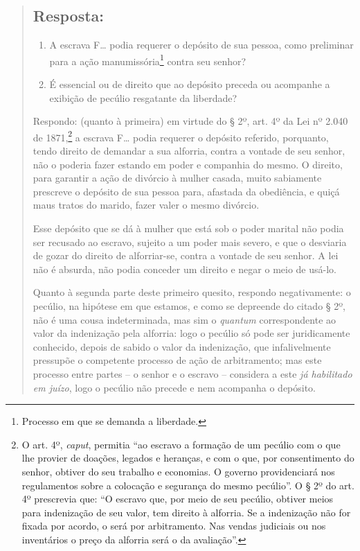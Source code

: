 \begin{quote}
\subsection{Resposta:}

\begin{enumerate}[label=\arabic*º]
O primeiro quesito tem duas partes:

\item A escrava F\ldots{} podia requerer o depósito de sua pessoa, como
preliminar para a ação manumissória\footnote{ Processo em que se
  demanda a liberdade.} contra seu senhor?

\item É essencial ou de direito que ao depósito preceda ou acompanhe a
exibição de pecúlio resgatante da liberdade?
\end{enumerate}

Respondo: (quanto à primeira) em virtude do § 2º, art. 4º da Lei nº
2.040 de 1871,\footnote{ O art. 4º, \emph{caput}, permitia ``ao escravo
  a formação de um pecúlio com o que lhe provier de doações, legados e
  heranças, e com o que, por consentimento do senhor, obtiver do seu
  trabalho e economias. O governo providenciará nos regulamentos sobre a
  colocação e segurança do mesmo pecúlio''. O § 2º do art. 4º prescrevia
  que: ``O escravo que, por meio de seu pecúlio, obtiver meios para
  indenização de seu valor, tem direito à alforria. Se a indenização não
  for fixada por acordo, o será por arbitramento. Nas vendas judiciais
  ou nos inventários o preço da alforria será o da avaliação''.} a
escrava F\ldots{} podia requerer o depósito referido, porquanto, tendo
direito de demandar a sua alforria, contra a vontade de seu senhor, não
o poderia fazer estando em poder e companhia do mesmo. O direito, para
garantir a ação de divórcio à mulher casada, muito sabiamente prescreve
o depósito de sua pessoa para, afastada da obediência, e quiçá maus
tratos do marido, fazer valer o mesmo divórcio.

Esse depósito que se dá à mulher que está sob o poder marital não podia
ser recusado ao escravo, sujeito a um poder mais severo, e que o
desviaria de gozar do direito de alforriar-se, contra a vontade de seu
senhor. A lei não é absurda, não podia conceder um direito e negar o
meio de usá-lo.

Quanto à segunda parte deste primeiro quesito, respondo negativamente: o
pecúlio, na hipótese em que estamos, e como se depreende do citado § 2º,
não é uma cousa indeterminada, mas sim o \emph{quantum} correspondente
ao valor da indenização pela alforria: logo o pecúlio só pode ser
juridicamente conhecido, depois de sabido o valor da indenização, que
infalivelmente pressupõe o competente processo de ação de arbitramento;
mas este processo entre partes -- o senhor e o escravo -- considera a
este \emph{já habilitado em juízo}, logo o pecúlio não precede e nem
acompanha o depósito.


\end{quote}
